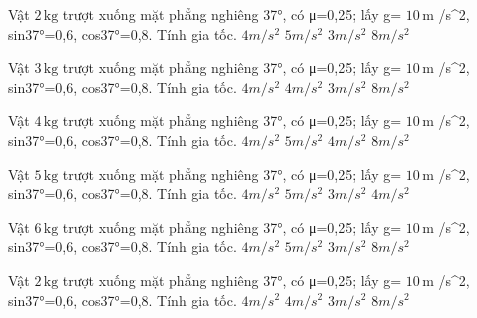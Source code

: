 \begin{ex}
Vật $2\,\text{kg}$ trượt xuống mặt phẳng nghiêng 37°, có μ=0,25; lấy g= $10\,\text{m}$ /s^2, sin37°=0,6, cos37°=0,8. Tính gia tốc.
\choice
{\True $4 m/s^2$}
{$5 m/s^2$}
{$3 m/s^2$}
{$8 m/s^2$}
\end{ex}

\begin{ex}
Vật $3\,\text{kg}$ trượt xuống mặt phẳng nghiêng 37°, có μ=0,25; lấy g= $10\,\text{m}$ /s^2, sin37°=0,6, cos37°=0,8. Tính gia tốc.
\choice
{$4 m/s^2$}
{\True $4 m/s^2$}
{$3 m/s^2$}
{$8 m/s^2$}
\end{ex}

\begin{ex}
Vật $4\,\text{kg}$ trượt xuống mặt phẳng nghiêng 37°, có μ=0,25; lấy g= $10\,\text{m}$ /s^2, sin37°=0,6, cos37°=0,8. Tính gia tốc.
\choice
{$4 m/s^2$}
{$5 m/s^2$}
{\True $4 m/s^2$}
{$8 m/s^2$}
\end{ex}

\begin{ex}
Vật $5\,\text{kg}$ trượt xuống mặt phẳng nghiêng 37°, có μ=0,25; lấy g= $10\,\text{m}$ /s^2, sin37°=0,6, cos37°=0,8. Tính gia tốc.
\choice
{$4 m/s^2$}
{$5 m/s^2$}
{$3 m/s^2$}
{\True $4 m/s^2$}
\end{ex}

\begin{ex}
Vật $6\,\text{kg}$ trượt xuống mặt phẳng nghiêng 37°, có μ=0,25; lấy g= $10\,\text{m}$ /s^2, sin37°=0,6, cos37°=0,8. Tính gia tốc.
\choice
{\True $4 m/s^2$}
{$5 m/s^2$}
{$3 m/s^2$}
{$8 m/s^2$}
\end{ex}

\begin{ex}
Vật $2\,\text{kg}$ trượt xuống mặt phẳng nghiêng 37°, có μ=0,25; lấy g= $10\,\text{m}$ /s^2, sin37°=0,6, cos37°=0,8. Tính gia tốc.
\choice
{$4 m/s^2$}
{\True $4 m/s^2$}
{$3 m/s^2$}
{$8 m/s^2$}
\end{ex}

